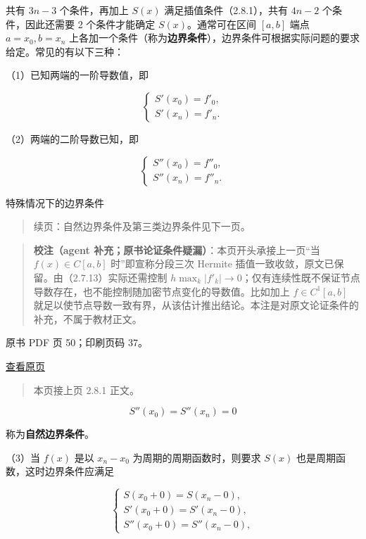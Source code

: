 共有 \(3n-3\) 个条件，再加上 \(S(x)\) 满足插值条件（2.8.1），共有 \(4n-2\) 个条件，因此还需要 2 个条件才能确定 \(S(x)\)。通常可在区间 \([a,b]\) 端点 \(a=x_0,b=x_n\) 上各加一个条件（称为\textbf{边界条件}），边界条件可根据实际问题的要求给定。常见的有以下三种：

（1）已知两端的一阶导数值，即

\[\begin{cases}S'(x_0)=f'_0,\\S'(x_n)=f'_n.\end{cases}\tag{2.8.3}\]

（2）两端的二阶导数已知，即

\[\begin{cases}S''(x_0)=f''_0,\\S''(x_n)=f''_n.\end{cases}\tag{2.8.4}\]

特殊情况下的边界条件

\begin{quote}
续页：自然边界条件及第三类边界条件见下一页。
\end{quote}

\begin{quote}
\textbf{校注（agent 补充；原书论证条件疑漏）}：本页开头承接上一页``当 \(f(x)\in C[a,b]\) 时''即宣称分段三次 Hermite 插值一致收敛，原文已保留。由（2.7.13）实际还需控制 \(h\max_k|f'_k|\to0\)；仅有连续性既不保证节点导数存在，也不能控制随加密节点变化的导数值。比如加上 \(f\in C^1[a,b]\) 就足以使节点导数一致有界，从该估计推出结论。本注是对原文论证条件的补充，不属于教材正文。
\end{quote}

\clearpage

原书 PDF 页 50；印刷页码 37。

\href{source-images/pdf-050.jpeg}{查看原页}

\begin{quote}
本页接上页 2.8.1 正文。
\end{quote}

\[S''(x_0)=S''(x_n)=0\tag{2.8.4'}\]

称为\textbf{自然边界条件}。

（3）当 \(f(x)\) 是以 \(x_n-x_0\) 为周期的周期函数时，则要求 \(S(x)\) 也是周期函数，这时边界条件应满足

\[\begin{cases}
S(x_0+0)=S(x_n-0),\\
S'(x_0+0)=S'(x_n-0),\\
S''(x_0+0)=S''(x_n-0),
\end{cases}\tag{2.8.5}\]

